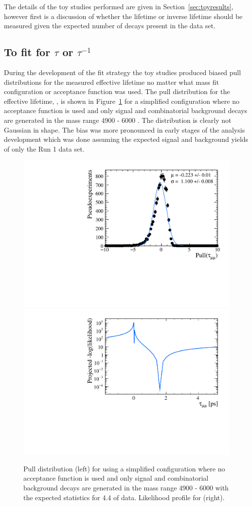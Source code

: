  The details of the toy studies performed are given in Section~\ref{sec:toyresults}, however first is a discussion of whether the lifetime or inverse lifetime should be measured given the expected number of decays present in the data set.  

\subsection{To fit for $\tau$ or $\tau^{-1}$}
\label{sec:tauORinvtau}
During the development of the fit strategy the toy studies produced biased pull distributions for the measured \bsmumu effective lifetime no matter what mass fit configuration or acceptance function was used. The pull distribution for the effective lifetime, \tmumu, is shown in Figure~\ref{fig:taupulls} for a simplified configuration where no acceptance function is used and only signal and combinatorial background decays are generated in the mass range 4900 - 6000 \mevcc. The distribution is clearly not Gaussian in shape. The bias was more pronounced in early stages of the analysis development which was done assuming the expected signal and background yields of only the Run 1 data set.%

\begin{figure}[htbp]
    \centering
        \includegraphics[width= 0.49 \textwidth]{./Figs/LifetimeMeasurement/CKM_simple_tau_pull.pdf} 
        \includegraphics[width= 0.49 \textwidth]{./Figs/LifetimeMeasurement/tau_LL.pdf}  

 
    \caption{Pull distribution (left) for \tmumu using a simplified configuration where no acceptance function is used and only signal and combinatorial background decays are generated in the mass range 4900 - 6000 \mevcc with the expected statistics for 4.4 \fb of data. Likelihood profile for \tmumu(right).}%
    \label{fig:taupulls}
\end{figure}

